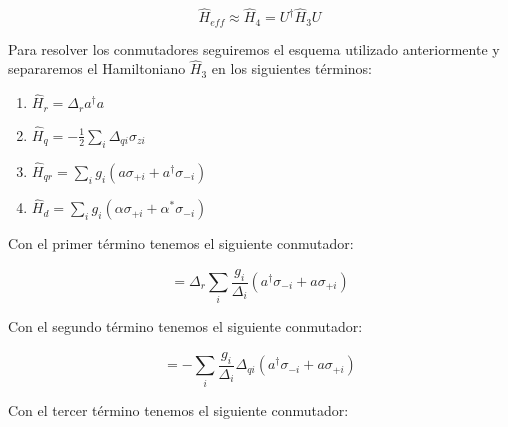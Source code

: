 \begin{equation}
    \hat{H}_{eff} \approx \hat{H}_4 = U^\dagger \hat{H}_3 U
\end{equation}

Para resolver los conmutadores seguiremos el esquema utilizado anteriormente y separaremos el Hamiltoniano $\hat{H}_3$ en los siguientes términos:

\begin{enumerate}
    \item $\hat{H}_r = \Delta_r a^\dagger a$
    \item $\hat{H}_q = - \frac{1}{2} \sum\limits_i \Delta_{qi} \sigma_{zi}$
    \item $\hat{H}_{qr} = \sum\limits_i g_i (a \sigma_{+i} + a^\dagger \sigma_{-i})$
    \item $\hat{H}_d = \sum\limits_i g_i (\alpha \sigma_{+i} + \alpha^* \sigma_{-i})$
\end{enumerate}

Con el primer término tenemos el siguiente conmutador:

\begin{equation}
    [\Delta_r a^\dagger a, \sum\limits_i \frac{g_i} {\Delta_i} (a^\dagger \sigma_{-i} - a \sigma_{+i})] = \Delta_r \sum\limits_i \frac{g_i} {\Delta_i} (a^\dagger \sigma_{-i} + a \sigma_{+i})
\end{equation}

Con el segundo término tenemos el siguiente conmutador:

\begin{equation}
    [- \frac{1}{2} \sum\limits_i \Delta_{qi} \sigma_{zi}, \sum\limits_i \frac{g_i} {\Delta_i} (a^\dagger \sigma_{-i} - a \sigma_{+i})] = - \sum\limits_i \frac{g_i} {\Delta_i} \Delta_{qi} (a^\dagger \sigma_{-i} + a \sigma_{+i})
\end{equation}

Con el tercer término tenemos el siguiente conmutador:

